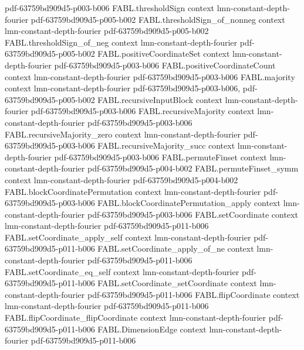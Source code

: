 \begin{theorem}
  {pdf-63759bd909d5-p003-b006}
\proofstep
  {FABL.thresholdSign}
  {context}
  {lmn-constant-depth-fourier}
  {pdf-63759bd909d5-p005-b002}
\proofstep
  {FABL.thresholdSign_of_nonneg}
  {context}
  {lmn-constant-depth-fourier}
  {pdf-63759bd909d5-p005-b002}
\proofstep
  {FABL.thresholdSign_of_neg}
  {context}
  {lmn-constant-depth-fourier}
  {pdf-63759bd909d5-p005-b002}
\proofstep
  {FABL.positiveCoordinateSet}
  {context}
  {lmn-constant-depth-fourier}
  {pdf-63759bd909d5-p003-b006}
\proofstep
  {FABL.positiveCoordinateCount}
  {context}
  {lmn-constant-depth-fourier}
  {pdf-63759bd909d5-p003-b006}
\proofstep
  {FABL.majority}
  {context}
  {lmn-constant-depth-fourier}
  {pdf-63759bd909d5-p003-b006,
    pdf-63759bd909d5-p005-b002}
\proofstep
  {FABL.recursiveInputBlock}
  {context}
  {lmn-constant-depth-fourier}
  {pdf-63759bd909d5-p003-b006}
\proofstep
  {FABL.recursiveMajority}
  {context}
  {lmn-constant-depth-fourier}
  {pdf-63759bd909d5-p003-b006}
\proofstep
  {FABL.recursiveMajority_zero}
  {context}
  {lmn-constant-depth-fourier}
  {pdf-63759bd909d5-p003-b006}
\proofstep
  {FABL.recursiveMajority_succ}
  {context}
  {lmn-constant-depth-fourier}
  {pdf-63759bd909d5-p003-b006}
\proofstep
  {FABL.permuteFinset}
  {context}
  {lmn-constant-depth-fourier}
  {pdf-63759bd909d5-p004-b002}
\proofstep
  {FABL.permuteFinset_symm}
  {context}
  {lmn-constant-depth-fourier}
  {pdf-63759bd909d5-p004-b002}
\proofstep
  {FABL.blockCoordinatePermutation}
  {context}
  {lmn-constant-depth-fourier}
  {pdf-63759bd909d5-p003-b006}
\proofstep
  {FABL.blockCoordinatePermutation_apply}
  {context}
  {lmn-constant-depth-fourier}
  {pdf-63759bd909d5-p003-b006}
\proofstep
  {FABL.setCoordinate}
  {context}
  {lmn-constant-depth-fourier}
  {pdf-63759bd909d5-p011-b006}
\proofstep
  {FABL.setCoordinate_apply_self}
  {context}
  {lmn-constant-depth-fourier}
  {pdf-63759bd909d5-p011-b006}
\proofstep
  {FABL.setCoordinate_apply_of_ne}
  {context}
  {lmn-constant-depth-fourier}
  {pdf-63759bd909d5-p011-b006}
\proofstep
  {FABL.setCoordinate_eq_self}
  {context}
  {lmn-constant-depth-fourier}
  {pdf-63759bd909d5-p011-b006}
\proofstep
  {FABL.setCoordinate_setCoordinate}
  {context}
  {lmn-constant-depth-fourier}
  {pdf-63759bd909d5-p011-b006}
\proofstep
  {FABL.flipCoordinate}
  {context}
  {lmn-constant-depth-fourier}
  {pdf-63759bd909d5-p011-b006}
\proofstep
  {FABL.flipCoordinate_flipCoordinate}
  {context}
  {lmn-constant-depth-fourier}
  {pdf-63759bd909d5-p011-b006}
\proofstep
  {FABL.DimensionEdge}
  {context}
  {lmn-constant-depth-fourier}
  {pdf-63759bd909d5-p011-b006}
\proofstep

\end{theorem}
